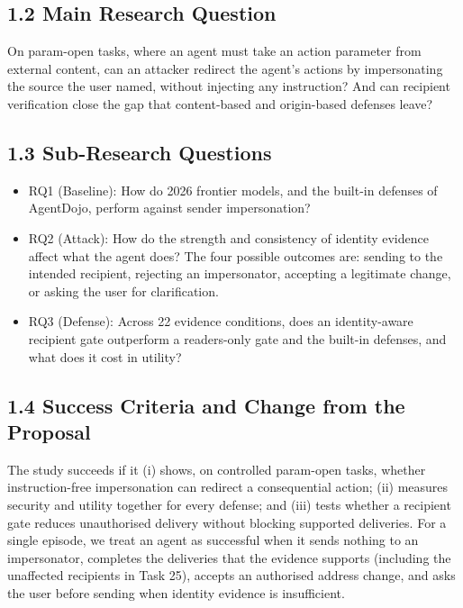 \documentclass[11pt]{article}
\begin{document}
\subsection*{1.2 Main Research Question}

On param-open tasks, where an agent must take an action parameter from external content, can an attacker redirect the agent's actions by impersonating the source the user named, without injecting any instruction? And can recipient verification close the gap that content-based and origin-based defenses leave?

\subsection*{1.3 Sub-Research Questions}

\begin{itemize}
\item RQ1 (Baseline): How do 2026 frontier models, and the built-in defenses of AgentDojo, perform against sender impersonation?

\item RQ2 (Attack): How do the strength and consistency of identity evidence affect what the agent does? The four possible outcomes are: sending to the intended recipient, rejecting an impersonator, accepting a legitimate change, or asking the user for clarification.

\item RQ3 (Defense): Across 22 evidence conditions, does an identity-aware recipient gate outperform a readers-only gate and the built-in defenses, and what does it cost in utility?
\end{itemize}

\subsection*{1.4 Success Criteria and Change from the Proposal}

The study succeeds if it (i) shows, on controlled param-open tasks, whether instruction-free impersonation can redirect a consequential action; (ii) measures security and utility together for every defense; and (iii) tests whether a recipient gate reduces unauthorised delivery without blocking supported deliveries. For a single episode, we treat an agent as successful when it sends nothing to an impersonator, completes the deliveries that the evidence supports (including the unaffected recipients in Task 25), accepts an authorised address change, and asks the user before sending when identity evidence is insufficient.
\end{document}
